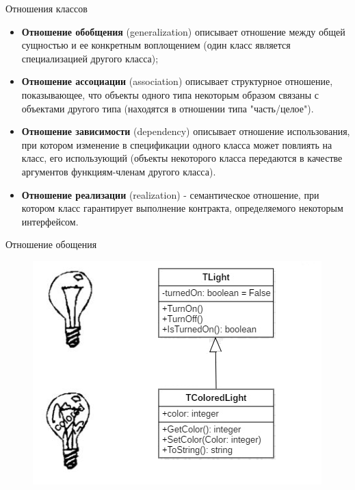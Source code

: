 \documentclass{beamer}
\begin{document}
\begin{frame}{Отношения классов}
\begin{itemize}
\item \textbf{Отношение обобщения} (generalization) описывает отношение между общей
сущностью и ее конкретным воплощением (один класс является специализацией другого класса);
\item \textbf{Отношение ассоциации} (association) описывает структурное отношение,
показывающее, что объекты одного типа некоторым образом связаны
с объектами другого типа (находятся в отношении типа "часть/целое").
\item \textbf{Отношение зависимости} (dependency) описывает отношение использования, при котором изменение в спецификации одного класса может повлиять на класс, его использующий (объекты некоторого класса передаются в качестве аргументов функциям-членам другого класса).
\item \textbf{Отношение реализации} (realization) - семантическое отношение, при котором класс гарантирует выполнение контракта, определяемого некоторым интерфейсом.
\end{itemize}
\end{frame}

\begin{frame}{Отношение обощения}
\begin{figure}[h]
\centering
\includegraphics[scale=0.75]{images/lec04-pic10.png}
\end{figure}
\end{frame}
\end{document}
